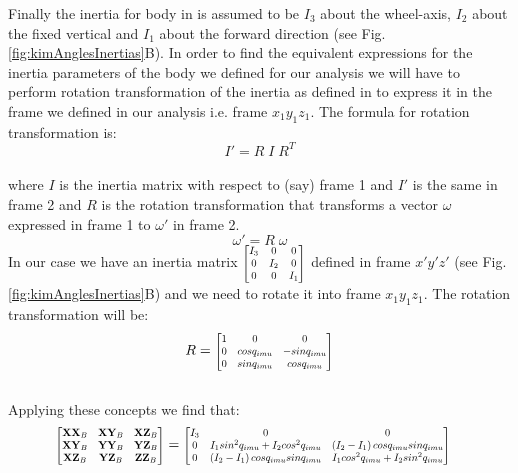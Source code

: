 \documentclass[a4paper,10pt]{article}
\newcommand\scalemath[2]{\scalebox{#1}{\mbox{\ensuremath{\displaystyle #2}}}}
\begin{document}
Finally the inertia for body in \cite{kim2005dynamic} is assumed to be $I_3$ about the wheel-axis, $I_2$ about the fixed vertical
and $I_1$ about the forward direction (see Fig. \ref{fig:kimAnglesInertias}B). In order to find the equivalent expressions for the
inertia parameters of the body we defined for our analysis we will have to perform rotation transformation of the inertia
as defined in \cite{kim2005dynamic} to express it in the frame we defined in our analysis i.e. frame $x_1y_1z_1$. The formula for rotation transformation
is:
\[
 I'=R\;I\;R^T
\]
\\where $I$ is the inertia matrix with respect to (say) frame 1 and $I'$ is the same in frame 2
and $R$ is the rotation transformation that transforms a vector $\omega$ expressed in frame 1 to $\omega'$
in frame 2.
\[
 \omega' = R\;\omega
\]
In our case we have an inertia matrix $\scalemath{0.75}{\left[\begin{matrix} I_3 & 0 & 0 \\ 0 & I_2 & 0 \\ 0 & 0 & I_1 \end{matrix}\right]}$ defined in
frame $x'y'z'$ (see Fig. \ref{fig:kimAnglesInertias}B) and we need to rotate it into frame $x_1y_1z_1$. The rotation transformation
will be:
\[
 R=\scalemath{0.75}{\left[\begin{matrix} 1 & 0 & 0 \\ 0 & cosq_{imu} & -sinq_{imu} \\ 0 & sinq_{imu} & cosq_{imu} \end{matrix}\right]}
\]
\\Applying these concepts we find that:
\begin{align}
 \scalemath{0.75}{\left[\begin{matrix} \mathbf{XX}_B & \mathbf{XY}_B & \mathbf{XZ}_B \\
  \mathbf{XY}_B & \mathbf{YY}_B & \mathbf{YZ}_B \\ 
  \mathbf{XZ}_B & \mathbf{YZ}_B & \mathbf{ZZ}_B \end{matrix}\right]} &=
  \scalemath{0.75}{\left[\begin{matrix} I_3 & 0 & 0 \\ 
   0 & I_1sin^2q_{imu}+I_2cos^2q_{imu} & \left(I_2-I_1\right)cosq_{imu}sinq_{imu} \\ 
   0 & \left(I_2-I_1\right)cosq_{imu}sinq_{imu} & I_1cos^2q_{imu}+I_2sin^2q_{imu} \end{matrix}\right]} \label{subsEnd}
\end{align}\\
\end{document}
